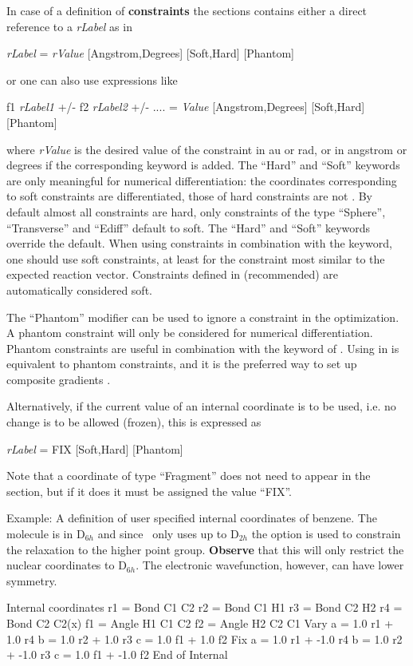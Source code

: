 In case of a definition of {\bf constraints} the sections contains either a
direct reference to a {\em rLabel} as in

     {\em rLabel} = {\em rValue} [Angstrom,Degrees] [Soft,Hard] [Phantom]

or one can also use expressions like

     f1 {\em rLabel1} +/- f2 {\em rLabel2} +/- .... = {\em Value} [Angstrom,Degrees] [Soft,Hard] [Phantom]

where {\em rValue} is the desired value of the constraint in au or rad, or in
angstrom or degrees if the corresponding keyword is added. The ``Hard'' and ``Soft''
keywords are only meaningful for numerical differentiation: the coordinates corresponding
to soft constraints are differentiated, those of hard constraints are not \cite{Stenrup2015}.
By default almost all constraints are hard, only constraints of the type ``Sphere'', ``Transverse''
and ``Ediff'' default to soft. The ``Hard'' and ``Soft'' keywords override the default.
When using constraints in combination with the  keyword, one should use
soft constraints, at least for the constraint most similar to the expected reaction vector.
Constraints defined in  (recommended) are automatically considered
soft.

The ``Phantom'' modifier can be used to ignore a constraint in the optimization. A phantom
constraint will only be considered for numerical differentiation. Phantom constraints are
useful in combination with the  keyword of .
Using  in  is equivalent to phantom constraints,
and it is the preferred way to set up composite gradients \cite{Stenrup2015}.

Alternatively, if the current value of an internal coordinate is to be used, i.e.
no change is to be allowed (frozen), this is expressed as

     {\em rLabel} = FIX [Soft,Hard] [Phantom]

Note that a coordinate of type ``Fragment'' does not need to appear in the 
section, but if it does it must be assigned the value ``FIX''.

Example: A definition of user specified internal coordinates of benzene. The molecule is
in D$_{6h}$ and since \molcas\ only uses up to D$_{2h}$ the
 option is used to
constrain the relaxation to the higher point group. {\bf Observe} that this will
only restrict the nuclear coordinates to D$_{6h}$. The electronic wavefunction,
however, can have lower symmetry.
\begin{inputlisting}
Internal coordinates
r1 = Bond C1 C2
r2 = Bond C1 H1
r3 = Bond C2 H2
r4 = Bond C2 C2(x)
f1 = Angle H1 C1 C2
f2 = Angle H2 C2 C1
Vary
a = 1.0 r1 +  1.0 r4
b = 1.0 r2 +  1.0 r3
c = 1.0 f1 +  1.0 f2
Fix
a = 1.0 r1 + -1.0 r4
b = 1.0 r2 + -1.0 r3
c = 1.0 f1 + -1.0 f2
End of Internal
\end{inputlisting}



